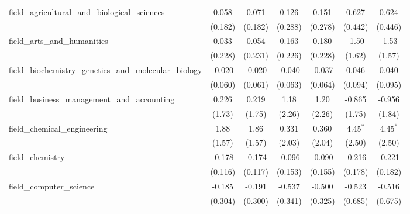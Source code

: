 \begin{tabular}{lcccccc}
   field\_agricultural\_and\_biological\_sciences              & 0.058         & 0.071        & 0.126        & 0.151        & 0.627          & 0.624\\   
                                                               & (0.182)       & (0.182)      & (0.288)      & (0.278)      & (0.442)        & (0.446)\\   
   field\_arts\_and\_humanities                                & 0.033         & 0.054        & 0.163        & 0.180        & -1.50          & -1.53\\   
                                                               & (0.228)       & (0.231)      & (0.226)      & (0.228)      & (1.62)         & (1.57)\\   
   field\_biochemistry\_genetics\_and\_molecular\_biology      & -0.020        & -0.020       & -0.040       & -0.037       & 0.046          & 0.040\\   
                                                               & (0.060)       & (0.061)      & (0.063)      & (0.064)      & (0.094)        & (0.095)\\   
   field\_business\_management\_and\_accounting                & 0.226         & 0.219        & 1.18         & 1.20         & -0.865         & -0.956\\   
                                                               & (1.73)        & (1.75)       & (2.26)       & (2.26)       & (1.75)         & (1.84)\\   
   field\_chemical\_engineering                                & 1.88          & 1.86         & 0.331        & 0.360        & 4.45$^{*}$     & 4.45$^{*}$\\   
                                                               & (1.57)        & (1.57)       & (2.03)       & (2.04)       & (2.50)         & (2.50)\\   
   field\_chemistry                                            & -0.178        & -0.174       & -0.096       & -0.090       & -0.216         & -0.221\\   
                                                               & (0.116)       & (0.117)      & (0.153)      & (0.155)      & (0.178)        & (0.182)\\   
   field\_computer\_science                                    & -0.185        & -0.191       & -0.537       & -0.500       & -0.523         & -0.516\\   
                                                               & (0.304)       & (0.300)      & (0.341)      & (0.325)      & (0.685)        & (0.675)\\   

\end{tabular}
